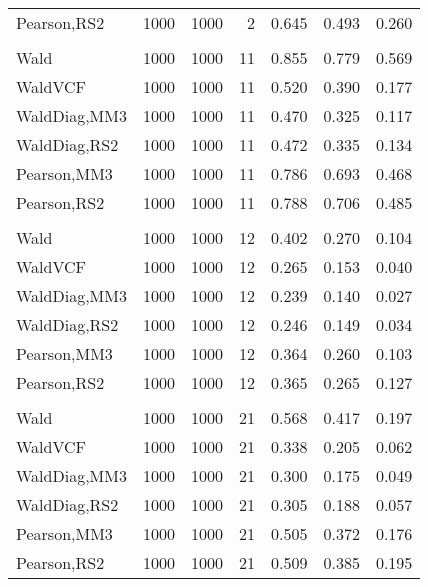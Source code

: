 \documentclass[
]{article}
\begin{document}
\begin{table}[H]
{\begin{tabular}[t]{lrrrrrr}
\hspace{1em}Pearson,RS2 & 1000 & 1000 & 2 & 0.645 & 0.493 & 0.260\\
\addlinespace[0.3em]
\multicolumn{7}{l}{\textbf{1F 15V}}\\
\hspace{1em}Wald & 1000 & 1000 & 11 & 0.855 & 0.779 & 0.569\\
\hspace{1em}WaldVCF & 1000 & 1000 & 11 & 0.520 & 0.390 & 0.177\\
\hspace{1em}WaldDiag,MM3 & 1000 & 1000 & 11 & 0.470 & 0.325 & 0.117\\
\hspace{1em}WaldDiag,RS2 & 1000 & 1000 & 11 & 0.472 & 0.335 & 0.134\\
\hspace{1em}Pearson,MM3 & 1000 & 1000 & 11 & 0.786 & 0.693 & 0.468\\
\hspace{1em}Pearson,RS2 & 1000 & 1000 & 11 & 0.788 & 0.706 & 0.485\\
\addlinespace[0.3em]
\multicolumn{7}{l}{\textbf{2F 10V}}\\
\hspace{1em}Wald & 1000 & 1000 & 12 & 0.402 & 0.270 & 0.104\\
\hspace{1em}WaldVCF & 1000 & 1000 & 12 & 0.265 & 0.153 & 0.040\\
\hspace{1em}WaldDiag,MM3 & 1000 & 1000 & 12 & 0.239 & 0.140 & 0.027\\
\hspace{1em}WaldDiag,RS2 & 1000 & 1000 & 12 & 0.246 & 0.149 & 0.034\\
\hspace{1em}Pearson,MM3 & 1000 & 1000 & 12 & 0.364 & 0.260 & 0.103\\
\hspace{1em}Pearson,RS2 & 1000 & 1000 & 12 & 0.365 & 0.265 & 0.127\\
\addlinespace[0.3em]
\multicolumn{7}{l}{\textbf{3F 15V}}\\
\hspace{1em}Wald & 1000 & 1000 & 21 & 0.568 & 0.417 & 0.197\\
\hspace{1em}WaldVCF & 1000 & 1000 & 21 & 0.338 & 0.205 & 0.062\\
\hspace{1em}WaldDiag,MM3 & 1000 & 1000 & 21 & 0.300 & 0.175 & 0.049\\
\hspace{1em}WaldDiag,RS2 & 1000 & 1000 & 21 & 0.305 & 0.188 & 0.057\\
\hspace{1em}Pearson,MM3 & 1000 & 1000 & 21 & 0.505 & 0.372 & 0.176\\
\hspace{1em}Pearson,RS2 & 1000 & 1000 & 21 & 0.509 & 0.385 & 0.195\\
\bottomrule
\end{tabular}}
\endgroup{}
\end{table}
\end{document}
